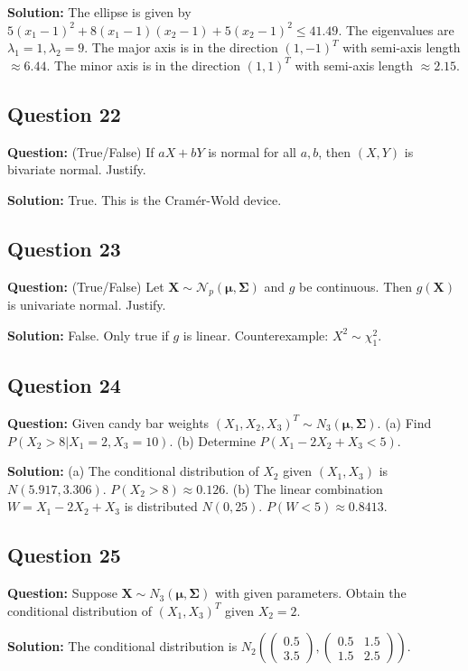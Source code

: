 \textbf{Solution:}
The ellipse is given by $5(x_1-1)^2 + 8(x_1-1)(x_2-1) + 5(x_2-1)^2 \le 41.49$.
The eigenvalues are $\lambda_1=1, \lambda_2=9$. The major axis is in the direction $(1, -1)^T$ with semi-axis length $\approx 6.44$. The minor axis is in the direction $(1, 1)^T$ with semi-axis length $\approx 2.15$.

\subsection*{Question 22}
\textbf{Question:} (True/False) If $aX + bY$ is normal for all $a, b$, then $(X, Y)$ is bivariate normal. Justify.

\textbf{Solution:}
True. This is the Cramér-Wold device.

\subsection*{Question 23}
\textbf{Question:} (True/False) Let $\mathbf{X} \sim \mathcal{N}_p(\boldsymbol{\mu}, \boldsymbol{\Sigma})$ and $g$ be continuous. Then $g(\mathbf{X})$ is univariate normal. Justify.

\textbf{Solution:}
False. Only true if $g$ is linear. Counterexample: $X^2 \sim \chi^2_1$.

\subsection*{Question 24}
\textbf{Question:} Given candy bar weights $(X_1, X_2, X_3)^T \sim N_3(\boldsymbol{\mu}, \boldsymbol{\Sigma})$. (a) Find $P(X_2 > 8 | X_1=2, X_3=10)$. (b) Determine $P(X_1 - 2X_2 + X_3 < 5)$.

\textbf{Solution:}
(a) The conditional distribution of $X_2$ given $(X_1, X_3)$ is $N(5.917, 3.306)$. $P(X_2 > 8) \approx 0.126$.
(b) The linear combination $W = X_1 - 2X_2 + X_3$ is distributed $N(0, 25)$. $P(W < 5) \approx 0.8413$.

\subsection*{Question 25}
\textbf{Question:} Suppose $\mathbf{X} \sim N_3(\boldsymbol{\mu}, \boldsymbol{\Sigma})$ with given parameters. Obtain the conditional distribution of $(X_1, X_3)^T$ given $X_2 = 2$.

\textbf{Solution:}
The conditional distribution is $N_2\left(\begin{pmatrix} 0.5 \\ 3.5 \end{pmatrix}, \begin{pmatrix} 0.5 & 1.5 \\ 1.5 & 2.5 \end{pmatrix}\right)$.

